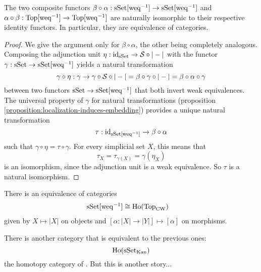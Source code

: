 \begin{theorem}
The two composite functors $\beta\circ\alpha:\sSet[\weq^\inv]\to\sSet[\weq^\inv]$ and $\alpha\circ\beta:\Top[\weq^\inv]\to\Top[\weq^\inv]$ are naturally isomorphic to their respective identity functors. In particular, they are equivalence of categories.
\end{theorem}

\begin{proof}
We give the argument only for $\beta\circ\alpha$, the other being completely analogous. Composing the adjunction unit $\eta:\id_\sSet\to\S\circ|-|$ with the functor $\gamma:\sSet\to\sSet[\weq^\inv]$ yields a natural transformation
\[\gamma\circ\eta:\gamma\to\gamma\circ\S\circ|-|=\beta\circ\gamma\circ|-|=\beta\circ\alpha\circ\gamma\]
between two functors $\sSet\to\sSet[\weq^\inv]$ that both invert weak equivalences. The universal property of $\gamma$ for natural transformations (proposition \ref{proposition:localization-induces-embedding}) provides a unique natural transformation \[\tau:\id_{\sSet[\weq^\inv]}\to\beta\circ\alpha\]
such that $\gamma\circ\eta=\tau\circ\gamma$. For every simplicial set $X$, this means that
\[\tau_X=\tau_{\gamma(X)}=\gamma(\eta_X)\]
is an isomorphism, since the adjunction unit is a weak equivalence. So $\tau$ is a natural isomorphism.
\end{proof}


\begin{corollary}
There is an equivalence of categories
\begin{align*}
    \sSet[\weq^\inv]&\cong\Ho(\Top_\text{\upshape CW})
\end{align*}
given by $X\mapsto|X|$ on objects and $[\alpha:|X|\to|Y|]\mapsto[\alpha]$ on morphisms.
\end{corollary}

\begin{remark}
There is another category that is equivalent to the previous ones:
\[\Ho(\sSet_\text{Kan})\]
the homotopy category of . But this is another story...
\end{remark}
